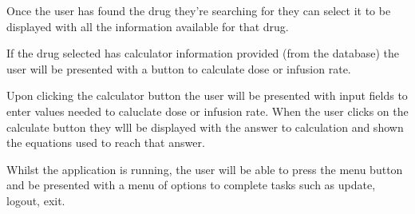 \documentclass[11pt,fleqn,twoside]{article}
\begin{document}
Once the user has found the drug they're searching for they can select it to be displayed with all the information available for that drug.

If the drug selected has calculator information provided (from the database) the user will be presented with a button to calculate dose or infusion rate.

Upon clicking the calculator button the user will be presented with input fields to enter values needed to caluclate dose or infusion rate. When the user clicks on the calculate button they wlll be displayed with the answer to calculation and shown the equations used to reach that answer.

Whilst the application is running, the user will be able to press the menu button and be presented with a menu of options to complete tasks such as update, logout, exit.
\end{document}
